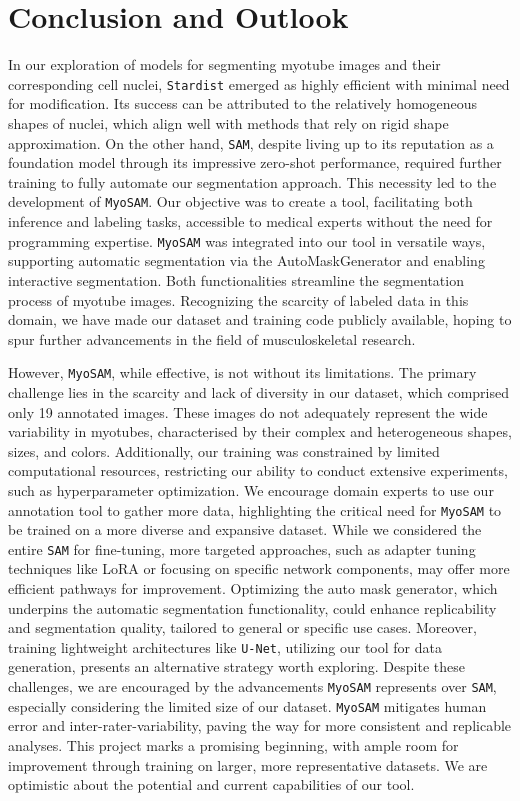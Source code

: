 \section{Conclusion and Outlook}
In our exploration of models for segmenting myotube images and their corresponding cell nuclei, \texttt{Stardist} emerged as highly efficient with minimal need for modification. Its success can be attributed to the relatively homogeneous shapes of nuclei, which align well with methods that rely on rigid shape approximation. On the other hand, \texttt{SAM}, despite living up to its reputation as a foundation model through its impressive zero-shot performance, required further training to fully automate our segmentation approach. This necessity led to the development of \texttt{MyoSAM}. Our objective was to create a tool, facilitating both inference and labeling tasks, accessible to medical experts without the need for programming expertise. \texttt{MyoSAM} was integrated into our tool in versatile ways, supporting automatic segmentation via the AutoMaskGenerator and enabling interactive segmentation. Both functionalities streamline the segmentation process of myotube images. Recognizing the scarcity of labeled data in this domain, we have made our dataset and training code publicly available, hoping to spur further advancements in the field of musculoskeletal research.

However, \texttt{MyoSAM}, while effective, is not without its limitations. The primary challenge lies in the scarcity and lack of diversity in our dataset, which comprised only 19 annotated images. These images do not adequately represent the wide variability in myotubes, characterised by their complex and heterogeneous shapes, sizes, and colors. Additionally, our training was constrained by limited computational resources, restricting our ability to conduct extensive experiments, such as hyperparameter optimization.
We encourage domain experts to use our annotation tool to gather more data, highlighting the critical need for \texttt{MyoSAM} to be trained on a more diverse and expansive dataset. While we considered the entire \texttt{SAM} for fine-tuning, more targeted approaches, such as adapter tuning techniques like LoRA or focusing on specific network components, may offer more efficient pathways for improvement. Optimizing the auto mask generator, which underpins the automatic segmentation functionality, could enhance replicability and segmentation quality, tailored to general or specific use cases. Moreover, training lightweight architectures like \texttt{U-Net}, utilizing our tool for data generation, presents an alternative strategy worth exploring.
Despite these challenges, we are encouraged by the advancements \texttt{MyoSAM} represents over \texttt{SAM}, especially considering the limited size of our dataset. \texttt{MyoSAM} mitigates human error and inter-rater-variability, paving the way for more consistent and replicable analyses. This project marks a promising beginning, with ample room for improvement through training on larger, more representative datasets. We are optimistic about the potential and current capabilities of our tool.
